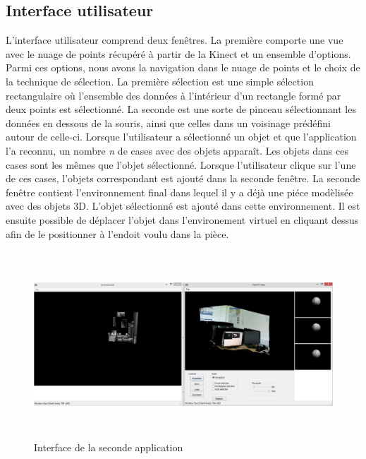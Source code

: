 \subsection{Interface utilisateur}
L'interface utilisateur comprend deux fenêtres. La première comporte une vue avec le nuage de points récupéré à partir de la Kinect
et un ensemble d'options. Parmi ces options, nous avons la navigation dans le nuage de points et le choix de la technique de 
sélection. La première sélection est une simple sélection rectangulaire où l'ensemble des données à l'intérieur d'un rectangle formé
par deux points est sélectionné. La seconde est une sorte de pinceau sélectionnant les données en dessous de la souris, ainsi que celles dans 
un voisinage prédéfini autour de celle-ci. Lorsque l'utilisateur a sélectionné un objet et que l'application l'a reconnu, un nombre \textit{n} de cases 
avec des objets apparaît. Les objets dans ces cases sont les mêmes que l'objet sélectionné. Lorsque l'utilisateur clique sur l'une 
de ces cases, l'objets correspondant est ajouté dans la seconde fenêtre.
La seconde fenêtre contient l'environnement final dans lequel il y a déjà une piéce modèlisée avec des objets 3D. L'objet sélectionné est ajouté dans cette environnement. Il est ensuite possible de déplacer l'objet dans l'environement virtuel en
cliquant dessus afin de le positionner à l'endoit voulu dans la pièce.

\begin{figure}[!h]
  \begin{center}
    \includegraphics[height=7cm]{image/appliObjet.PNG}
    \caption{Interface de la seconde application}
  \end{center}
\end{figure}

